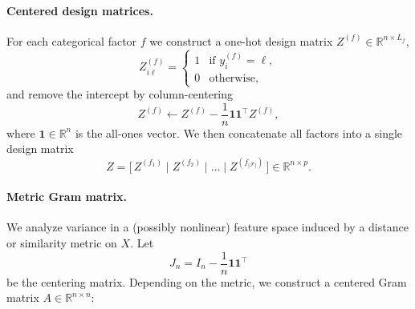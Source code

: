 \paragraph{Centered design matrices.}
For each categorical factor $f$ we construct a one-hot design matrix $Z^{(f)} \in \mathbb{R}^{n \times L_f}$,
\begin{equation}
    Z^{(f)}_{i\ell} = 
    \begin{cases}
        1 & \text{if } y_i^{(f)} = \ell, \\
        0 & \text{otherwise,}
    \end{cases}
\end{equation}
and remove the intercept by column-centering
\begin{equation}
    Z^{(f)} \leftarrow Z^{(f)} - \frac{1}{n}\mathbf{1}\mathbf{1}^\top Z^{(f)},
\end{equation}
where $\mathbf{1} \in \mathbb{R}^n$ is the all-ones vector.  
We then concatenate all factors into a single design matrix
\begin{equation}
    Z = \big[\,Z^{(f_1)} \;\big|\; Z^{(f_2)} \;\big|\; \dots \;\big|\; Z^{(f_{|\mathcal{F}|})}\,\big] \in \mathbb{R}^{n \times p}.
\end{equation}

\paragraph{Metric Gram matrix.}
We analyze variance in a (possibly nonlinear) feature space induced by a distance or similarity metric on $X$. Let
\begin{equation}
    J_n = I_n - \frac{1}{n}\mathbf{1}\mathbf{1}^\top
\end{equation}
be the centering matrix. Depending on the metric, we construct a centered Gram matrix $A \in \mathbb{R}^{n \times n}$:

